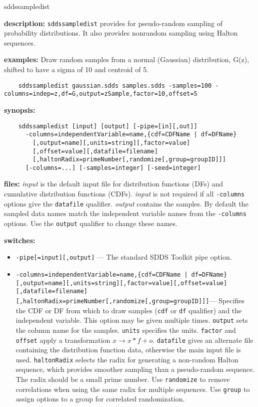 \begin{sddsprog}{sddssampledist}
  \item \textbf{description:} \verb|sddssampledist| provides for pseudo-random sampling of probability distributions. It also provides nonrandom sampling using Halton sequences.
  \item \textbf{examples:} Draw random samples from a normal (Gaussian) distribution, G(z), shifted to have a sigma of 10 and centroid of 5.
    \begin{verbatim}
    sddssampledist gaussian.sdds samples.sdds -samples=100 -columns=indep=z,df=G,output=zSample,factor=10,offset=5
    \end{verbatim}
  \item \textbf{synopsis:}
    \begin{verbatim}
    sddssampledist [input] [output] [-pipe=[in][,out]]
      -columns=independentVariable=name,{cdf=CDFName | df=DFName}
        [,output=name][,units=string][,factor=value]
        [,offset=value][,datafile=filename]
        [,haltonRadix=primeNumber[,randomize[,group=groupID]]]
      [-columns=...] [-samples=integer] [-seed=integer]
    \end{verbatim}
  \item \textbf{files:}
    \emph{input} is the default input file for distribution functions (DFs) and cumulative distribution functions (CDFs). \emph{input} is not required if all \verb|-columns| options give the \verb|datafile| qualifier.
    \emph{output} contains the samples. By default the sampled data names match the independent variable names from the \verb|-columns| options. Use the \verb|output| qualifier to change these names.
  \item \textbf{switches:}
    \begin{itemize}
      \item \verb|-pipe[=input][,output]| --- The standard SDDS Toolkit pipe option.
      \item \verb!-columns=independentVariable=name,{cdf=CDFName | df=DFName}[,output=name][,units=string][,factor=value][,offset=value][,datafile=filename][,haltonRadix=primeNumber[,randomize[,group=groupID]]]!--- Specifies the CDF or DF from which to draw samples (\verb|cdf| or \verb|df| qualifier) and the independent variable. This option may be given multiple times. \verb|output| sets the column name for the samples. \verb|units| specifies the units. \verb|factor| and \verb|offset| apply a transformation $x \rightarrow x*f+o$. \verb|datafile| gives an alternate file containing the distribution function data, otherwise the main input file is used. \verb|haltonRadix| selects the radix for generating a non-random Halton sequence, which provides smoother sampling than a pseudo-random sequence. The radix should be a small prime number. Use \verb|randomize| to remove correlations when using the same radix for multiple sequences. Use \verb|group| to assign options to a group for correlated randomization.

\end{itemize}
\end{sddsprog}

